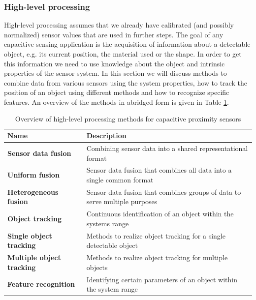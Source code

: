 \subsubsection{High-level processing}
High-level processing assumes that we already have calibrated (and possibly normalized) sensor values that are used in further steps. The goal of any capacitive sensing application is the acquisition of information about a detectable object, e.g. its current position, the material used or the shape. In order to get this information we need to use knowledge about the object and intrinsic properties of the sensor system. In this section we will discuss methods to combine data from various sensors using the system properties, how to track the position of an object using different methods and how to recognize specific features. An overview of the methods in abridged form is given in Table \ref{tab:rel_highlevel}. 
\begin{table}[htbp]
  \centering
  \caption{Overview of high-level processing methods for capacitive proximity sensors}
    \begin{tabular}{lp{5cm}}
    \toprule
    \textbf{Name} & \textbf{Description} \\
    \midrule
    \textbf{Sensor data fusion} & Combining sensor data into a shared representational format \\
    \textbf{Uniform fusion} & Sensor data fusion that combines all data into a single common format \\
    \textbf{Heterogeneous fusion} & Sensor data fusion that combines groups of data to serve multiple purposes \\
    \textbf{Object tracking } & Continuous identification of an object within the systems range \\
    \textbf{Single object tracking} & Methods to realize object tracking for a single detectable object \\
    \textbf{Multiple object tracking} & Methods to realize object tracking for multiple objects \\
    \textbf{Feature recognition} & Identifying certain parameters of an object within the system range \\
    \bottomrule
    \end{tabular}%
  \label{tab:rel_highlevel}
\end{table}%


